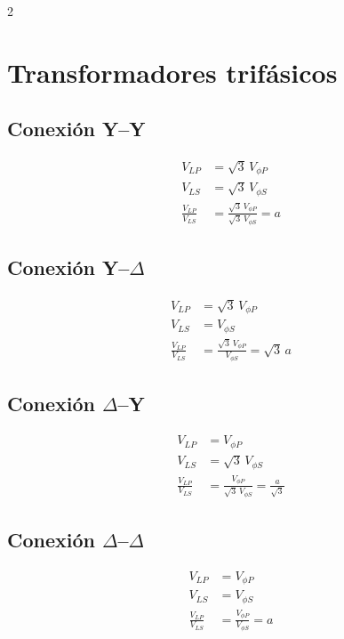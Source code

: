 \documentclass{article}
\begin{document}
\begin{multicols}{2}

\section*{Transformadores trifásicos}

\subsection*{Conexión Y--Y}
\begin{align}
  V_{LP} &= \sqrt{3}\, V_{\phi P} \\
  V_{LS} &= \sqrt{3}\, V_{\phi S} \\
  \frac{V_{LP}}{V_{LS}} &= \frac{\sqrt{3}\, V_{\phi P}}{\sqrt{3}\, V_{\phi S}} = a
\end{align}

\subsection*{Conexión Y--$\Delta$}
\begin{align}
  V_{LP} &= \sqrt{3}\, V_{\phi P} \\
  V_{LS} &= V_{\phi S} \\
  \frac{V_{LP}}{V_{LS}} &= \frac{\sqrt{3}\, V_{\phi P}}{V_{\phi S}} = \sqrt{3}\, a
\end{align}

\subsection*{Conexión $\Delta$--Y}
\begin{align}
  V_{LP} &= V_{\phi P} \\
  V_{LS} &= \sqrt{3}\, V_{\phi S} \\
  \frac{V_{LP}}{V_{LS}} &= \frac{V_{\phi P}}{\sqrt{3}\, V_{\phi S}} = \frac{a}{\sqrt{3}}
\end{align}

\subsection*{Conexión $\Delta$--$\Delta$}
\begin{align}
  V_{LP} &= V_{\phi P} \\
  V_{LS} &= V_{\phi S} \\
  \frac{V_{LP}}{V_{LS}} &= \frac{V_{\phi P}}{V_{\phi S}} = a
\end{align}

\end{multicols}
\end{document}
